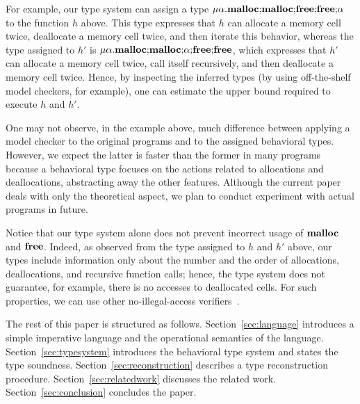 For example, our type system can assign a type
\(\mu\alpha.\mathbf{malloc};\!\mathbf{malloc};\!\mathbf{free};\!\mathbf{free};\!\alpha\) to
the function \(h\) above.  This type expresses that \(h\) can allocate
a memory cell twice, deallocate a memory cell twice, and then iterate
this behavior, whereas the type assigned to \(h'\) is
\(\mu\alpha.\mathbf{malloc};\!\mathbf{malloc};\!\alpha;\!\mathbf{free};\!\mathbf{free}\),
which expresses that \(h'\) can allocate a memory cell twice, call
itself recursively, and then deallocate a memory cell twice.  Hence,
by inspecting the inferred types (by using off-the-shelf model
checkers, for example), one can estimate the upper bound required to
execute \(h\) and \(h'\).


One may not observe, in the example above, much difference between
applying a model checker to the original programs and to the assigned
behavioral types.  However, we expect the latter is faster than the
former in many programs because a behavioral type focuses on the
actions related to allocations and deallocations, abstracting away the
other features.  Although the current paper deals with only the
theoretical aspect, we plan to conduct experiment with actual programs
in future.

Notice that our type system alone does not prevent incorrect usage of
\(\mathbf{malloc}\) and \(\mathbf{free}\).  Indeed, as observed from the type assigned
to \(h\) and \(h'\) above, our types include information only about
the number and the order of allocations, deallocations, and recursive
function calls; hence, the type system does not guarantee, for
example, there is no accesses to deallocated cells.  For such
properties, we can use other no-illegal-access verifiers~\cite{DBLP:conf/aplas/SuenagaK09}.

The rest of this paper is structured as
follows. Section~\ref{sec:language} introduces a simple imperative
language and the operational semantics of the
language. Section~\ref{sec:typesystem} introduces the behavioral type
system and states the type soundness. Section~\ref{sec:reconstruction}
describes a type reconstruction procedure.
Section~\ref{sec:relatedwork} discusses the related
work. Section~\ref{sec:conclusion} concludes the paper.


